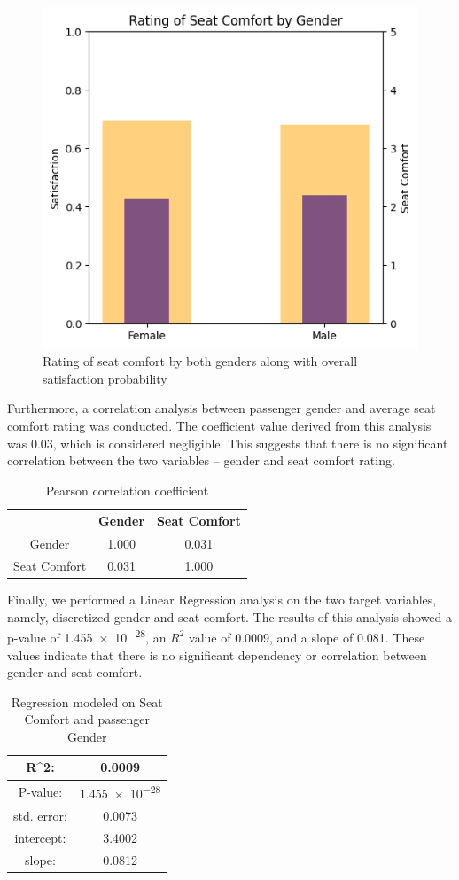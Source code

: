 \documentclass[11pt]{article}
\begin{document}
\begin{figure}[h]
\centering
\includegraphics[width=0.3\linewidth]{project_files/project_50_0.png}
\caption{\centering Rating of seat comfort by both genders along with overall satisfaction probability}
\end{figure}

Furthermore, a correlation analysis between passenger gender and average seat comfort rating was conducted. The coefficient value derived from this analysis was \num{0.03}, which is considered negligible. This suggests that there is no significant correlation between the two variables – gender and seat comfort rating.

\begin{table}[!h]
    \centering
    \begin{tabular}{|c|c|c|}
        \hline
        &  Gender  & Seat Comfort \\
        \hline
        Gender    &  1.000    &  0.031 \\
        \hline
        Seat Comfort & 0.031    &  1.000 \\
        \hline
    \end{tabular}
    \caption{\centering Pearson correlation coefficient}
    \label{tab:7-1-2}
\end{table}

Finally, we performed a Linear Regression analysis on the two target variables, namely, discretized gender and seat comfort. The results of this analysis showed a p-value of \num{1.455e-28}, an $R^2$ value of \num{0.0009}, and a slope of \num{0.081}. These values indicate that there is no significant dependency or correlation between gender and seat comfort.

\begin{table}[!h]
    \centering
    \begin{tabular}{|c|c|}
        \hline
        R\^{}2:    & 0.0009 \\
        \hline
        P-value:   & \num{1.455e-28} \\
        \hline
        std. error:& 0.0073 \\
        \hline
        intercept: & 3.4002 \\
        \hline
        slope:     & 0.0812 \\
        \hline
    \end{tabular}
    \caption{\centering Regression modeled on Seat Comfort and passenger Gender}
    \label{tab:7-1-3}
\end{table}
\end{document}
